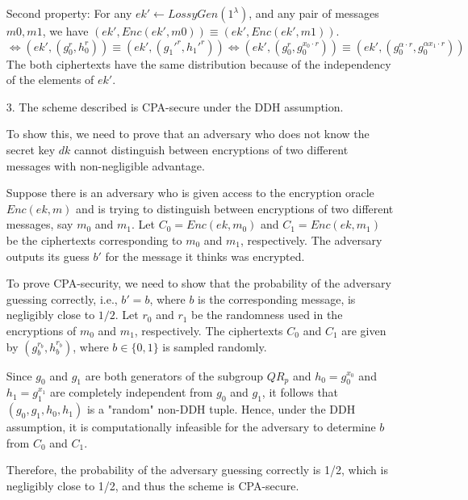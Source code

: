 \begin{itemize}
Second property: 
For any \(ek' \leftarrow LossyGen(1^\lambda)\),
and any pair of messages \(m0,m1\), we have \((ek', Enc(ek',m0)) \equiv (ek', Enc(ek',m1))\).\\
\(\Leftrightarrow (ek', (g_0^r, h_0^r)) \equiv (ek', (g_1'^r, h_1'^r)) \Leftrightarrow (ek', (g_0^r, g_0^{x_0 \cdot r})) \equiv (ek', (g_0^{\alpha \cdot r}, g_0^{\alpha x_1 \cdot r}))\)
The both ciphertexts have the same distribution because of the independency of the elements of \(ek'\).

    \item [3.]
        The scheme described is CPA-secure under the DDH assumption. 
        
        To show this, we need to prove that an adversary who does not know the secret key $dk$
         cannot distinguish between encryptions of two different messages with non-negligible advantage.

        Suppose there is an adversary who is given access to the encryption oracle $Enc(ek, m)$
         and is trying to distinguish between encryptions of two different messages, say $m_0$ and $m_1$. 
         Let $C_0 = Enc(ek, m_0)$ and $C_1 = Enc(ek, m_1)$ be the ciphertexts corresponding to $m_0$ and $m_1$, respectively. 
         The adversary outputs its guess $b'$ for the message it thinks was encrypted.
        

        To prove CPA-security, we need to show that the probability of the adversary guessing correctly,
         i.e., $b' = b$, where $b$ is the corresponding message, is negligibly close to $1/2$. 
         Let $r_0$ and $r_1$ be the randomness used in the encryptions of $m_0$ and $m_1$, respectively. 
         The ciphertexts $C_0$ and $C_1$ are given by $(g_b^{r_b}, h_b^{r_b})$, where $b \in \{0, 1\}$ is sampled randomly.
        
        Since $g_0$ and $g_1$ are both generators of the subgroup $QR_p$ and $h_0 = g_0^{x_0}$ and $h_1 = g_1^{x_1}$
         are completely independent from $g_0$ and $g_1$, it follows that $(g_0, g_1, h_0, h_1)$ is a "random" non-DDH tuple.
          Hence, under the DDH assumption, it is computationally infeasible for the adversary to determine $b$ from $C_0$ and $C_1$.
        
        Therefore, the probability of the adversary guessing correctly is 1/2, which is negligibly close to 1/2, and thus the scheme is CPA-secure.
        
\end{itemize}